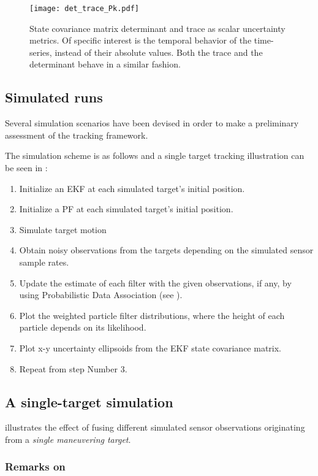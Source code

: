 \begin{figure}
	\centering
	\texttt{[image: det\_trace\_Pk.pdf]}
	\caption{State covariance matrix determinant and trace as scalar uncertainty metrics. Of specific interest is the temporal behavior of the time-series, instead of their absolute values. Both the trace and the determinant behave in a similar fashion.}
	\label{fig:dettracepk}
\end{figure}


\subsection{Simulated runs}
Several simulation scenarios have been devised in order to make a preliminary assessment of the tracking framework. 

The simulation scheme is as follows and a single target tracking illustration can be seen in :

\begin{enumerate}
	\item Initialize an EKF at each simulated target's initial position.
	\item Initialize a PF at each simulated target's initial position.
	\item Simulate target motion
	\item Obtain noisy observations from the targets depending on the simulated sensor sample rates.
	\item Update the estimate of each filter with the given observations, if any, by using Probabilistic Data Association (see ).
	\item Plot the weighted particle filter distributions, where the height of each particle depends on its likelihood.
	\item Plot x-y uncertainty ellipsoids from the EKF state covariance matrix.
	\item Repeat from step Number 3.
\end{enumerate}
\subsection{A single-target simulation}
 illustrates the effect of fusing different simulated sensor observations originating from a \emph{single maneuvering target}.
%
\subsubsection{Remarks on }

